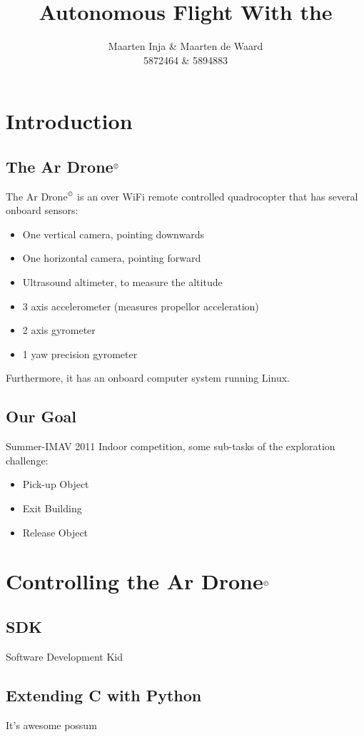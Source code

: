 \documentclass[a4paper,10pt]{article}
\title{Autonomous Flight With the \Ardrone}
\author{Maarten Inja \& Maarten de Waard\\\small 5872464 \& 5894883}
\newcommand{\Ardrone}{Ar Drone$^{\copyright}$ }
\begin{document}
\maketitle

\section{Introduction}

\subsection{The \Ardrone}
The \Ardrone is an over WiFi remote controlled quadrocopter that has several onboard sensors:
\begin{itemize}
	\item One vertical camera, pointing downwards
	\item One horizontal camera, pointing forward 
	\item Ultrasound altimeter, to measure the altitude
    \item 3 axis accelerometer (measures propellor acceleration)
    \item 2 axis gyrometer 
    \item 1 yaw precision gyrometer
\end{itemize}
Furthermore, it has an onboard computer system running Linux. 


\subsection{Our Goal}
Summer-IMAV 2011 Indoor competition, some sub-tasks of the exploration challenge:
\begin{itemize}
    \item Pick-up Object
    \item Exit Building
    \item Release Object
\end{itemize}

\section{Controlling the \Ardrone}

\subsection{SDK}
Software Development Kid

\subsection{Extending C with Python}
It's awesome possum
\end{document}

